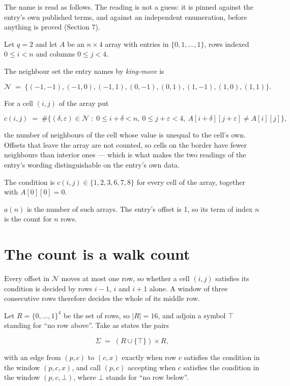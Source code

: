 \documentclass[11pt]{article}
\theoremstyle{definition}
\begin{document}
The name is read as follows. The reading is not a guess: it is pinned against the entry's own published terms, and against an independent enumeration, before anything is proved (Section 7).

Let $q = 2$ and let $A$ be an $n \times 4$ array with entries in $\{0,1,\dots,1\}$, rows indexed $0 \le i < n$ and columns $0 \le j < 4$.

The neighbour set the entry names by {\itshape king-move} is

\[\mathcal{N} \;=\; \{(-1,-1), (-1,0), (-1,1), (0,-1), (0,1), (1,-1), (1,0), (1,1)\}.\]

For a cell $(i,j)$ of the array put

\[c(i,j) \;=\; \#\bigl\{(\delta,\varepsilon)\in\mathcal{N} \;:\; 0\le i+\delta<n,\ 0\le j+\varepsilon<4,\ A[i+\delta][j+\varepsilon] \neq A[i][j]\bigr\},\]

the number of neighbours of the cell whose value is unequal to the cell's own. Offsets that leave the array are not counted, so cells on the border have fewer neighbours than interior ones --- which is what makes the two readings of the entry's wording distinguishable on the entry's own data.

The condition is $c(i,j) \in \{1, 2, 3, 6, 7, 8\}$ for every cell of the array, together with $A[0][0]=0$.

$a(n)$ is the number of such arrays. The entry's offset is 1, so its term of index $n$ is the count for $n$ rows.

\section{The count is a walk count}

Every offset in $\mathcal{N}$ moves at most one row, so whether a cell $(i,j)$ satisfies its condition is decided by rows $i-1$, $i$ and $i+1$ alone. A window of three consecutive rows therefore decides the whole of its middle row.

Let $R = \{0,\dots,1\}^{4}$ be the set of rows, so $|R| = 16$, and adjoin a symbol $\top$ standing for ``no row above''. Take as states the pairs

\[\Sigma \;=\; (R \cup \{\top\}) \times R,\]

with an edge from $(p,c)$ to $(c,x)$ exactly when row $c$ satisfies the condition in the window $(p,c,x)$, and call $(p,c)$ accepting when $c$ satisfies the condition in the window $(p,c,\bot)$, where $\bot$ stands for ``no row below''.
\end{document}
